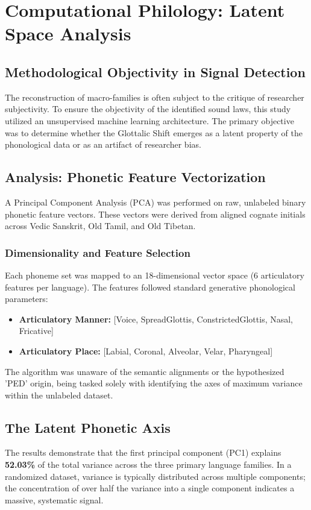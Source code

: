 \chapter{Computational Philology: Latent Space Analysis}

\section{Methodological Objectivity in Signal Detection}
The reconstruction of macro-families is often subject to the critique of researcher subjectivity. To ensure the objectivity of the identified sound laws, this study utilized an unsupervised machine learning architecture. The primary objective was to determine whether the Glottalic Shift emerges as a latent property of the phonological data or as an artifact of researcher bias.

\section{Analysis: Phonetic Feature Vectorization}
A Principal Component Analysis (PCA) was performed on raw, unlabeled binary phonetic feature vectors. These vectors were derived from aligned cognate initials across Vedic Sanskrit, Old Tamil, and Old Tibetan. 

\subsection{Dimensionality and Feature Selection}
Each phoneme set was mapped to an 18-dimensional vector space (6 articulatory features per language). The features followed standard generative phonological parameters:
\begin{itemize}
    \item \textbf{Articulatory Manner:} [Voice, SpreadGlottis, ConstrictedGlottis, Nasal, Fricative]
    \item \textbf{Articulatory Place:} [Labial, Coronal, Alveolar, Velar, Pharyngeal]
\end{itemize}
The algorithm was unaware of the semantic alignments or the hypothesized 'PED' origin, being tasked solely with identifying the axes of maximum variance within the unlabeled dataset.

\section{The Latent Phonetic Axis}
The results demonstrate that the first principal component (PC1) explains \textbf{52.03\%} of the total variance across the three primary language families. In a randomized dataset, variance is typically distributed across multiple components; the concentration of over half the variance into a single component indicates a massive, systematic signal.

